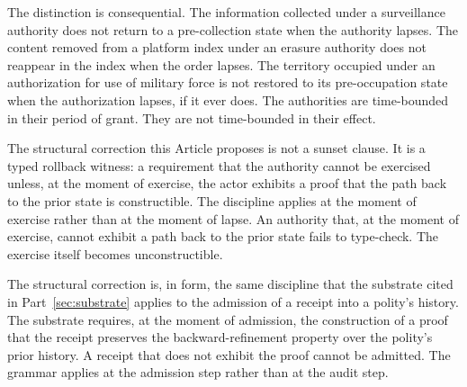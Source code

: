 The distinction is consequential.
The information collected under a surveillance authority does not return to a pre-collection state
when the authority lapses.
The content removed from a platform index under an erasure authority does not reappear in the index
when the order lapses.
The territory occupied under an authorization for use of military force is not restored to its
pre-occupation state when the authorization lapses, if it ever does.
The authorities are time-bounded in their period of grant.
They are not time-bounded in their effect.

The structural correction this Article proposes is not a sunset clause.
It is a typed rollback witness: a requirement that the authority cannot be exercised
unless, at the moment of exercise, the actor exhibits a proof that the path back to the prior state
is constructible.
The discipline applies at the moment of exercise rather than at the moment of lapse.
An authority that, at the moment of exercise, cannot exhibit a path back to the prior state
fails to type-check.
The exercise itself becomes unconstructible.

The structural correction is, in form, the same discipline that the substrate cited in
Part~\ref{sec:substrate} applies to the admission of a receipt into a polity's history.
The substrate requires, at the moment of admission, the construction of a proof that the receipt
preserves the backward-refinement property over the polity's prior history.
A receipt that does not exhibit the proof cannot be admitted.
The grammar applies at the admission step rather than at the audit step.

